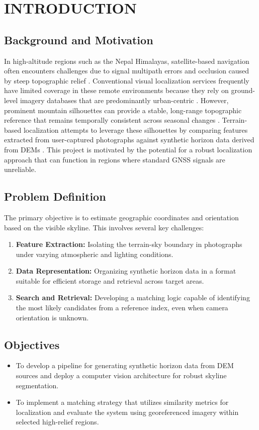 \chapter{INTRODUCTION}

\section{Background and Motivation}
In high-altitude regions such as the Nepal Himalayas, satellite-based navigation often encounters challenges due to signal multipath errors and occlusion caused by steep topographic relief \cite{liu2026enhancing, durgam2024cross}. Conventional visual localization services frequently have limited coverage in these remote environments because they rely on ground-level imagery databases that are predominantly urban-centric \cite{baatz2012large, chen2015camera}. However, prominent mountain silhouettes can provide a stable, long-range topographic reference that remains temporally consistent across seasonal changes \cite{norinder2025panoramic, rourera2022skyline}. Terrain-based localization attempts to leverage these silhouettes by comparing features extracted from user-captured photographs against synthetic horizon data derived from DEMs \cite{baatz2012large, tzeng2013user}. This project is motivated by the potential for a robust localization approach that can function in regions where standard GNSS signals are unreliable.

\section{Problem Definition}
The primary objective is to estimate geographic coordinates and orientation based on the visible skyline. This involves several key challenges:
\begin{enumerate}
    \item \textbf{Feature Extraction:} Isolating the terrain-sky boundary in photographs under varying atmospheric and lighting conditions.
    \item \textbf{Data Representation:} Organizing synthetic horizon data in a format suitable for efficient storage and retrieval across target areas.
    \item \textbf{Search and Retrieval:} Developing a matching logic capable of identifying the most likely candidates from a reference index, even when camera orientation is unknown.
\end{enumerate}

\section{Objectives}
\begin{itemize}
    \item To develop a pipeline for generating synthetic horizon data from DEM sources and deploy a computer vision architecture for robust skyline segmentation.
    \item To implement a matching strategy that utilizes similarity metrics for localization and evaluate the system using georeferenced imagery within selected high-relief regions.
\end{itemize}

